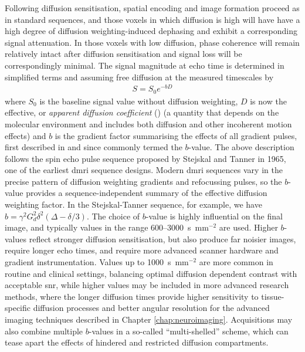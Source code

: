 \documentclass[12pt,phd,a4paper,twoside]{ucl_thesis}
\renewcommand{\textcite}[2][]{
\ifthenelse { \equal {#1} {} }  {\citeauthor{#2}\autocite{#2}}   {\citeauthor{#1}\autocite{#2}}}
\begin{document}
Following diffusion sensitisation, spatial encoding and image formation proceed as in standard sequences, and those voxels in which diffusion is high will have have a high degree of diffusion weighting-induced dephasing and exhibit a corresponding signal attenuation.
In those voxels with low diffusion, phase coherence will remain relatively intact after diffusion sensitisation and signal loss will be correspondingly minimal.
The signal magnitude at echo time is determined in simplified terms and assuming free diffusion at the measured timescales by
\begin{align}
    S = S_0e^{-bD}
\end{align}\label{eq:S}
where $S_0$ is the baseline signal value without diffusion weighting, $D$ is now the effective, or \textit{apparent diffusion coefficient} ()\autocite{Basser1994,Beaulieu2002} (a quantity that depends on the molecular environment and includes both diffusion and other incoherent motion effects) and $b$ is the gradient factor summarising the effects of all gradient pulses, first described in \textcite{LeBihan1986} and since commonly termed the $b$-value.
The above description follows the spin echo pulse sequence proposed by Stejskal and Tanner in 1965\autocite{Stejskal1965}, one of the earliest \gls{dmri} sequence designs.
Modern \gls{dmri} sequences vary in the precise pattern of diffusion weighting gradients and refocussing pulses, so the $b$-value provides a sequence-independent summary of the effective diffusion weighting factor.
In the Stejskal-Tanner sequence, for example, we have $b = \gamma^2 G_d^2 \delta^2 (\Delta-\delta/3)$.
The choice of $b$-value is highly influential on the final image, and typically values in the range 600--3000~s~mm$^{-2}$ are used.
Higher $b$-values reflect stronger diffusion sensitisation, but also produce far noisier images, require longer echo times, and require more advanced scanner hardware and gradient instrumentation\autocite{Tournier2011}.
Values up to 1000~s~mm$^{-2}$ are more common in routine and clinical settings, balancing optimal diffusion dependent contrast with acceptable \gls{snr}, while higher values may be included in more advanced research methods\autocite{Roberts2007}, where the longer diffusion times provide higher sensitivity to tissue-specific diffusion processes and better angular resolution for the advanced imaging techniques described in Chapter \ref{chap:neuroimaging}.
Acquisitions may also combine multiple $b$-values in a so-called ``multi-shelled'' scheme, which can tease apart the effects of hindered and restricted diffusion compartments\autocite{Clark2002,Assaf2005}.
\end{document}
